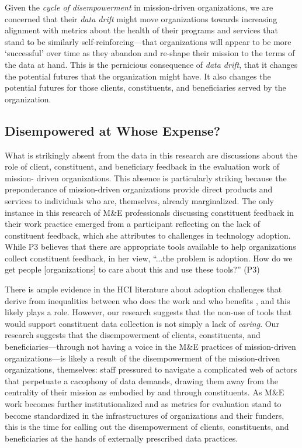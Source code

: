 Given the \textit{cycle of disempowerment} in mission-driven organizations, we are concerned that their \textit{data drift} might move organizations towards increasing alignment with metrics about the health of their programs and services that stand to be similarly self-reinforcing—that organizations will appear to be more ‘successful’ over time as they abandon and re-shape their mission to the terms of the data at hand. This is the pernicious consequence of \textit{data drift}, that it changes the potential futures that the organization might have. It also changes the potential futures for those clients, constituents, and beneficiaries served by the organization.

\subsection{Disempowered at Whose Expense?}

What is strikingly absent from the data in this research are discussions about the role of client, constituent, and beneficiary feedback in the evaluation work of mission- driven organizations. This absence is particularly striking because the preponderance of mission-driven organizations provide direct products and services to individuals who are, themselves, already marginalized. The only instance in this research of M\&E professionals discussing constituent feedback in their work practice emerged from a participant reflecting on the lack of constituent feedback, which she attributes to challenges in technology adoption. While P3 believes that there are appropriate tools available to help organizations collect constituent feedback, in her view, “...the problem is adoption. How do we get people [organizations] to care about this and use these tools?” (P3)

There is ample evidence in the HCI literature about adoption challenges that derive from inequalities between who does the work and who benefits \citep{Grudin1994Groupware}, and this likely plays a role. However, our research suggests that the non-use of tools that would support constituent data collection is not simply a lack of \textit{caring}. Our research suggests that the disempowerment of clients, constituents, and beneficiaries---through not having a voice in the M\&E practices of mission-driven organizations---is likely a result of the disempowerment of the mission-driven organizations, themselves: staff pressured to navigate a complicated web of actors that perpetuate a cacophony of data demands, drawing them away from the centrality of their mission as embodied by and through constituents. As M\&E work becomes further institutionalized and as metrics for evaluation stand to become standardized in the infrastructures of organizations and their funders, this is the time for calling out the disempowerment of clients, constituents, and beneficiaries at the hands of externally prescribed data practices.

